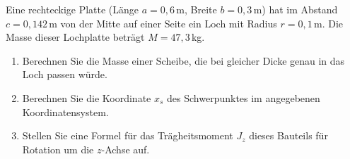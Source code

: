 \begin{ExerciseBlock}
Eine rechteckige Platte (Länge $a = 0,6\,$m, Breite $b = 0,3\,$m) hat im Abstand $c = 0,142\,$m von der Mitte auf einer Seite ein Loch mit Radius $r = 0,1\,$m. Die Masse dieser Lochplatte beträgt $M = 47,3\,$kg.

\begin{enumerate}
	\item Berechnen Sie die Masse einer Scheibe,
die bei gleicher Dicke genau in das Loch
passen würde.
	\item Berechnen Sie die Koordinate $x_s$ des Schwerpunktes im angegebenen Koordinatensystem.
	\item Stellen Sie eine Formel für das Trägheitsmoment $J_z$ dieses Bauteils für Rotation um die $z$-Achse auf.

\end{enumerate}

\begin{center}
\end{center}
\end{ExerciseBlock}
